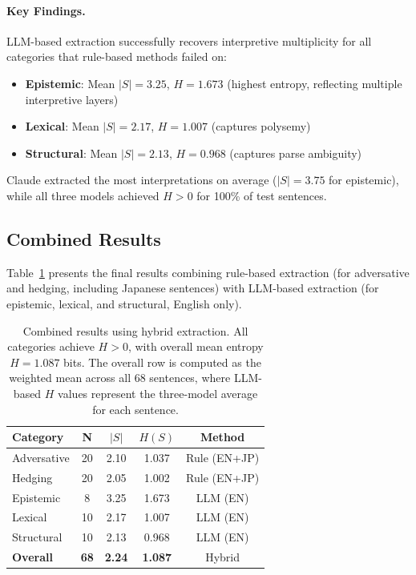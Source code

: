\documentclass[11pt,a4paper]{article}
\begin{document}
\paragraph{Key Findings.}

LLM-based extraction successfully recovers interpretive multiplicity for all 
categories that rule-based methods failed on:
\begin{itemize}
    \item \textbf{Epistemic}: Mean $|S| = 3.25$, $H = 1.673$ (highest entropy, 
          reflecting multiple interpretive layers)
    \item \textbf{Lexical}: Mean $|S| = 2.17$, $H = 1.007$ (captures polysemy)
    \item \textbf{Structural}: Mean $|S| = 2.13$, $H = 0.968$ (captures parse ambiguity)
\end{itemize}

Claude extracted the most interpretations on average ($|S| = 3.75$ for epistemic), 
while all three models achieved $H > 0$ for 100\% of test sentences.

\subsection{Combined Results}

Table~\ref{tab:results-combined} presents the final results combining rule-based 
extraction (for adversative and hedging, including Japanese sentences) with 
LLM-based extraction (for epistemic, lexical, and structural, English only).

\begin{table}[h]
\centering
\begin{tabular}{lcccc}
\toprule
\textbf{Category} & \textbf{N} & \textbf{$|S|$} & \textbf{$H(S)$} & \textbf{Method} \\
\midrule
Adversative & 20 & 2.10 & 1.037 & Rule (EN+JP) \\
Hedging & 20 & 2.05 & 1.002 & Rule (EN+JP) \\
Epistemic & 8 & 3.25 & 1.673 & LLM (EN) \\
Lexical & 10 & 2.17 & 1.007 & LLM (EN) \\
Structural & 10 & 2.13 & 0.968 & LLM (EN) \\
\midrule
\textbf{Overall} & \textbf{68} & \textbf{2.24} & \textbf{1.087} & Hybrid \\
\bottomrule
\end{tabular}
\caption{Combined results using hybrid extraction. All categories achieve $H > 0$, 
with overall mean entropy $H = 1.087$ bits. The overall row is computed as the 
weighted mean across all 68 sentences, where LLM-based $H$ values represent the 
three-model average for each sentence.}
\label{tab:results-combined}
\end{table}
\end{document}
